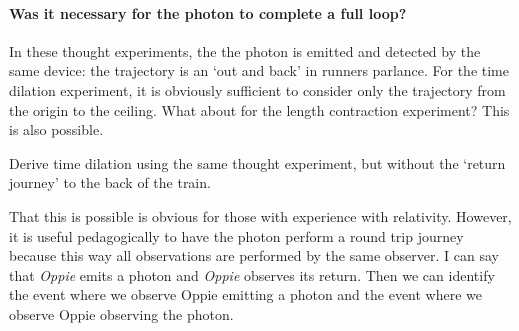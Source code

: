 \documentclass[12pt, oneside]{report}    %
\begin{document}
\begin{subappendices}
\paragraph{Was it necessary for the photon to complete a full loop?} In these thought experiments, the the photon is emitted and detected by the same device: the trajectory is an `out and back' in runners parlance. For the time dilation experiment, it is obviously sufficient to consider only the trajectory from the origin to the ceiling. What about for the length contraction experiment? This is also possible. 
\begin{exercise}
Derive time dilation using the same thought experiment, but without the `return journey' to the back of the train. 
\end{exercise}
That this is possible is obvious for those with experience with relativity. However, it is useful pedagogically to have the photon perform a round trip journey because this way all observations are performed by the same observer. I can say that \emph{Oppie} emits a photon and \emph{Oppie} observes its return. Then we can identify the event where we observe Oppie emitting a photon and the event where we observe Oppie observing the photon.


\end{subappendices}
\end{document}
